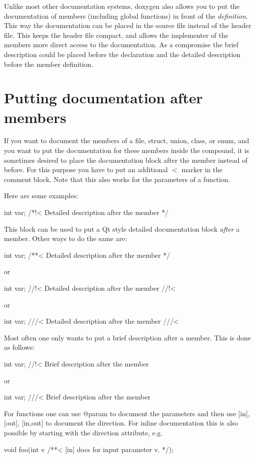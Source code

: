 Unlike most other documentation systems, doxygen also allows you to put the documentation of members (including global functions) in front of the {\itshape definition\/}. This way the documentation can be placed in the source file instead of the header file. This keeps the header file compact, and allows the implementer of the members more direct access to the documentation. As a compromise the brief description could be placed before the declaration and the detailed description before the member definition.\hypertarget{docblocks_memberdoc}{}\section{Putting documentation after members}\label{docblocks_memberdoc}
If you want to document the members of a file, struct, union, class, or enum, and you want to put the documentation for these members inside the compound, it is sometimes desired to place the documentation block after the member instead of before. For this purpose you have to put an additional $<$ marker in the comment block. Note that this also works for the parameters of a function.

Here are some examples: \begin{DoxyVerb}
int var; /*!< Detailed description after the member */
\end{DoxyVerb}
 This block can be used to put a Qt style detailed documentation block {\itshape after\/} a member. Other ways to do the same are: \begin{DoxyVerb}
int var; /**< Detailed description after the member */
\end{DoxyVerb}
 or \begin{DoxyVerb}
int var; //!< Detailed description after the member
         //!< 
\end{DoxyVerb}
 or \begin{DoxyVerb}
int var; ///< Detailed description after the member
         ///< 
\end{DoxyVerb}


Most often one only wants to put a brief description after a member. This is done as follows: \begin{DoxyVerb}
int var; //!< Brief description after the member
\end{DoxyVerb}
 or \begin{DoxyVerb}
int var; ///< Brief description after the member
\end{DoxyVerb}


For functions one can use @param to document the parameters and then use {\ttfamily \mbox{[}in\mbox{]}}, {\ttfamily \mbox{[}out\mbox{]}}, {\ttfamily \mbox{[}in,out\mbox{]}} to document the direction. For inline documentation this is also possible by starting with the direction attribute, e.g. \begin{DoxyVerb}
void foo(int v /**< [in] docs for input parameter v. */);
\end{DoxyVerb}


